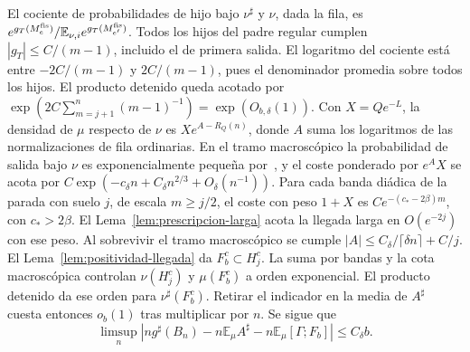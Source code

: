 El cociente de probabilidades de hijo bajo \(\nu^\sharp\) y \(\nu\), dada la fila, es
\(e^{g_T(M_e^{\rm fis})}/\mathbb E_{\nu,i}e^{g_T(M_{e'}^{\rm fis})}\).
Todos los hijos del padre regular cumplen \(|g_T|\le C/(m-1)\), incluido el de primera
salida. El logaritmo del cociente está entre \(-2C/(m-1)\) y \(2C/(m-1)\), pues el
denominador promedia sobre todos los hijos. El producto detenido queda acotado por
\(\exp(2C\sum_{m=j+1}^n(m-1)^{-1})=\exp(O_{b,\delta}(1))\). Con \(X=Qe^{-L}\),
la densidad de \(\mu\) respecto de \(\nu\) es \(Xe^{A-R_Q(n)}\), donde \(A\) suma los
logaritmos de las normalizaciones de fila ordinarias. En el tramo macroscópico la probabilidad
de salida bajo \(\nu\) es exponencialmente pequeña por~\cite[cor.~4.12]{tc}, y el coste
ponderado por \(e^AX\) se acota por
\(C\exp(-c_\delta n+C_\delta n^{2/3}+O_\delta(n^{-1}))\).
Para cada banda diádica de la parada con suelo \(j\), de escala \(m\ge j/2\), el coste con
peso \(1+X\) es
\(C e^{-(c_*-2\beta)m}\), con \(c_*>2\beta\).
El Lema~\ref{lem:prescripcion-larga} acota la llegada larga en \(O(e^{-2j})\) con ese peso.
Al sobrevivir el tramo macroscópico se cumple \(|A|\le C_\delta/\lceil\delta n\rceil+C/j\).
El Lema~\ref{lem:positividad-llegada} da \(F_b^c\subset H_j^c\). La suma por bandas y la
cota macroscópica controlan \(\nu(H_j^c)\) y \(\mu(F_b^c)\) a orden exponencial.
El producto detenido da ese orden para \(\nu^\sharp(F_b^c)\). Retirar el indicador en la media
de \(A^\sharp\) cuesta entonces \(o_b(1)\) tras multiplicar por \(n\). Se sigue que
\begin{equation}\label{eq:signed-mean}
 \limsup_n\left|n g^\sharp(B_n)-n\mathbb E_\mu A^\sharp
                 -n\mathbb E_\mu[\Gamma;F_b]\right|\le C_\delta b .
\end{equation}






